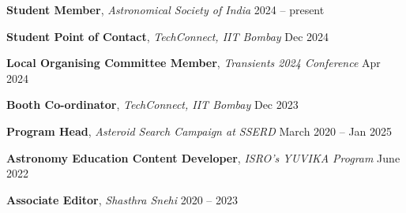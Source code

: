 \textbf{Student Member}, \textit{Astronomical Society of India} \hfill 2024 -- present

\vspace{0.2em}

\textbf{Student Point of Contact}, \textit{TechConnect, IIT Bombay} \hfill Dec 2024 \\

\vspace{0.2em}

\textbf{Local Organising Committee Member}, \textit{Transients 2024 Conference} \hfill Apr 2024 \\

\vspace{0.2em}

\textbf{Booth Co-ordinator}, \textit{TechConnect, IIT Bombay }\hfill Dec 2023 \\

\vspace{0.2em}

\textbf{Program Head}, \textit{Asteroid Search Campaign at SSERD} \hfill March 2020 -- Jan 2025 \\

\vspace{0.2em}

\textbf{Astronomy Education Content Developer}, \textit{ISRO's YUVIKA Program} \hfill June 2022 \\

\vspace{0.2em}

\textbf{Associate Editor}, \textit{Shasthra Snehi} \hfill 2020 -- 2023